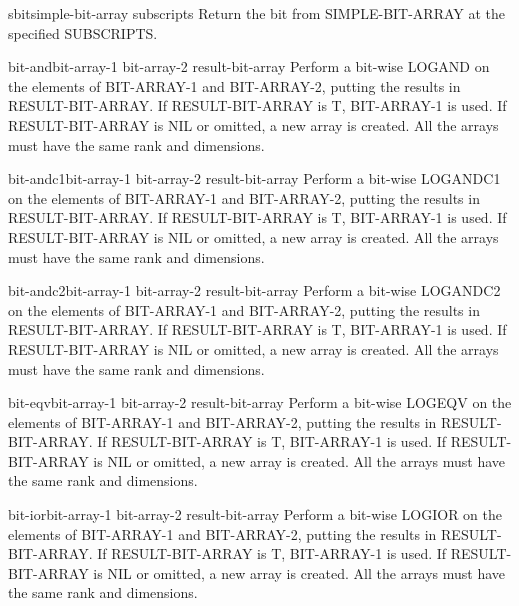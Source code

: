 \documentclass[10pt,english]{book}
\begin{document}
\begin{accessor}{sbit}{simple-bit-array \rest subscripts}
  Return the bit from SIMPLE-BIT-ARRAY at the specified SUBSCRIPTS.
\end{accessor}

\begin{function}{bit-and}{bit-array-1 bit-array-2 \op result-bit-array}
  Perform a bit-wise LOGAND on the elements of BIT-ARRAY-1 and BIT-ARRAY-2,
  putting the results in RESULT-BIT-ARRAY. If RESULT-BIT-ARRAY is T,
  BIT-ARRAY-1 is used. If RESULT-BIT-ARRAY is NIL or omitted, a new array is
  created. All the arrays must have the same rank and dimensions.
\end{function}

\begin{function}{bit-andc1}{bit-array-1 bit-array-2 \op result-bit-array}
  Perform a bit-wise LOGANDC1 on the elements of BIT-ARRAY-1 and BIT-ARRAY-2,
  putting the results in RESULT-BIT-ARRAY. If RESULT-BIT-ARRAY is T,
  BIT-ARRAY-1 is used. If RESULT-BIT-ARRAY is NIL or omitted, a new array is
  created. All the arrays must have the same rank and dimensions.
\end{function}

\begin{function}{bit-andc2}{bit-array-1 bit-array-2 \op result-bit-array}
  Perform a bit-wise LOGANDC2 on the elements of BIT-ARRAY-1 and BIT-ARRAY-2,
  putting the results in RESULT-BIT-ARRAY. If RESULT-BIT-ARRAY is T,
  BIT-ARRAY-1 is used. If RESULT-BIT-ARRAY is NIL or omitted, a new array is
  created. All the arrays must have the same rank and dimensions.
\end{function}

\begin{function}{bit-eqv}{bit-array-1 bit-array-2 \op result-bit-array}
  Perform a bit-wise LOGEQV on the elements of BIT-ARRAY-1 and BIT-ARRAY-2,
  putting the results in RESULT-BIT-ARRAY. If RESULT-BIT-ARRAY is T,
  BIT-ARRAY-1 is used. If RESULT-BIT-ARRAY is NIL or omitted, a new array is
  created. All the arrays must have the same rank and dimensions.
\end{function}

\begin{function}{bit-ior}{bit-array-1 bit-array-2 \op result-bit-array}
  Perform a bit-wise LOGIOR on the elements of BIT-ARRAY-1 and BIT-ARRAY-2,
  putting the results in RESULT-BIT-ARRAY. If RESULT-BIT-ARRAY is T,
  BIT-ARRAY-1 is used. If RESULT-BIT-ARRAY is NIL or omitted, a new array is
  created. All the arrays must have the same rank and dimensions.
\end{function}
\end{document}
